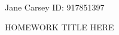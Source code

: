 \documentclass[letterpaper,12pt]{article}
\begin{document}
\begin{flushright} \large{Jane Carsey ID: 917851397} \end{flushright}
\large{HOMEWORK TITLE HERE} 


\begin{enumerate}



\end{enumerate}
\end{document}
